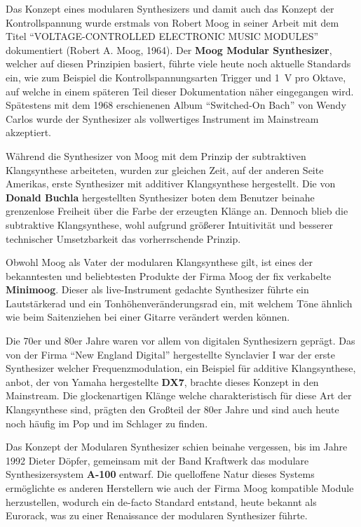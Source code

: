 Das Konzept eines modularen Synthesizers und damit auch das Konzept der Kontrollspannung wurde erstmals von Robert Moog in seiner Arbeit mit dem Titel "`VOLTAGE-CONTROLLED ELECTRONIC MUSIC MODULES"' dokumentiert (Robert A. Moog, 1964). Der \textbf{Moog Modular Synthesizer}, welcher auf diesen Prinzipien basiert, führte viele heute noch aktuelle Standards ein, wie zum Beispiel die Kontrollspannungsarten Trigger und \SI{1}{\volt} pro Oktave, auf welche in einem späteren Teil dieser Dokumentation näher eingegangen wird. Spätestens mit dem 1968 erschienenen Album "`Switched-On Bach"' von Wendy Carlos wurde der Synthesizer als vollwertiges Instrument im Mainstream akzeptiert.

Während die Synthesizer von Moog mit dem Prinzip der subtraktiven Klangsynthese arbeiteten, wurden zur gleichen Zeit, auf der anderen Seite Amerikas, erste Synthesizer mit additiver Klangsynthese hergestellt. Die von \textbf{Donald Buchla} hergestellten Synthesizer boten dem Benutzer beinahe grenzenlose Freiheit über die Farbe der erzeugten Klänge an. Dennoch blieb die subtraktive Klangsynthese, wohl aufgrund größerer Intuitivität und besserer technischer Umsetzbarkeit das vorherrschende Prinzip.

Obwohl Moog als Vater der modularen Klangsynthese gilt, ist eines der bekanntesten und beliebtesten Produkte der Firma Moog der fix verkabelte \textbf{Minimoog}. Dieser als live-Instrument gedachte Synthesizer führte ein Lautstärkerad und ein Tonhöhenveränderungsrad ein, mit welchem Töne ähnlich wie beim Saitenziehen bei einer Gitarre verändert werden können.

Die 70er und 80er Jahre waren vor allem von digitalen Synthesizern geprägt. Das von der Firma "`New England Digital"' hergestellte Synclavier I war der erste Synthesizer welcher Frequenzmodulation, ein Beispiel für additive Klangsynthese, anbot, der von Yamaha hergestellte \textbf{DX7}, brachte dieses Konzept in den Mainstream. Die glockenartigen Klänge welche charakteristisch für diese Art der Klangsynthese sind, prägten den Großteil der 80er Jahre und sind auch heute noch häufig im Pop und im Schlager zu finden.

Das Konzept der Modularen Synthesizer schien beinahe vergessen, bis im Jahre 1992 Dieter Döpfer, gemeinsam mit der Band Kraftwerk das modulare Synthesizersystem \textbf{A-100} entwarf. Die quelloffene Natur dieses Systems ermöglichte es anderen Herstellern wie auch der Firma Moog kompatible Module herzustellen, wodurch ein de-facto Standard entstand, heute bekannt als Eurorack, was zu einer Renaissance der modularen Synthesizer führte.

